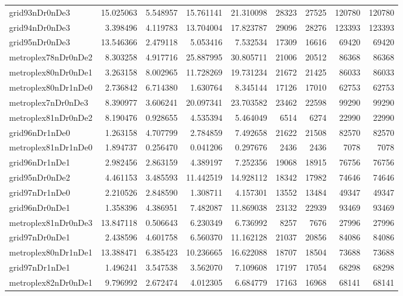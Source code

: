 \begin{longtable}{|l|r|r|r|r|r|r|r|r|}
grid93nDr0nDe3 & 15.025063 & 5.548957 & 15.761141 & 21.310098 & 28323 & 27525 & 120780 & 120780 \\
grid94nDr0nDe3 & 3.398496 & 4.119783 & 13.704004 & 17.823787 & 29096 & 28276 & 123393 & 123393 \\
grid95nDr0nDe3 & 13.546366 & 2.479118 & 5.053416 & 7.532534 & 17309 & 16616 & 69420 & 69420 \\
metroplex78nDr0nDe2 & 8.303258 & 4.917716 & 25.887995 & 30.805711 & 21006 & 20512 & 86368 & 86368 \\
metroplex80nDr0nDe1 & 3.263158 & 8.002965 & 11.728269 & 19.731234 & 21672 & 21425 & 86033 & 86033 \\
metroplex80nDr1nDe0 & 2.736842 & 6.714380 & 1.630764 & 8.345144 & 17126 & 17010 & 62753 & 62753 \\
metroplex7nDr0nDe3 & 8.390977 & 3.606241 & 20.097341 & 23.703582 & 23462 & 22598 & 99290 & 99290 \\
metroplex81nDr0nDe2 & 8.190476 & 0.928655 & 4.535394 & 5.464049 & 6514 & 6274 & 22990 & 22990 \\
grid96nDr1nDe0 & 1.263158 & 4.707799 & 2.784859 & 7.492658 & 21622 & 21508 & 82570 & 82570 \\
metroplex81nDr1nDe0 & 1.894737 & 0.256470 & 0.041206 & 0.297676 & 2436 & 2436 & 7078 & 7078 \\
grid96nDr1nDe1 & 2.982456 & 2.863159 & 4.389197 & 7.252356 & 19068 & 18915 & 76756 & 76756 \\
grid95nDr0nDe2 & 4.461153 & 3.485593 & 11.442519 & 14.928112 & 18342 & 17982 & 74646 & 74646 \\
grid97nDr1nDe0 & 2.210526 & 2.848590 & 1.308711 & 4.157301 & 13552 & 13484 & 49347 & 49347 \\
grid96nDr0nDe1 & 1.358396 & 4.386951 & 7.482087 & 11.869038 & 23132 & 22939 & 93469 & 93469 \\
metroplex81nDr0nDe3 & 13.847118 & 0.506643 & 6.230349 & 6.736992 & 8257 & 7676 & 27996 & 27996 \\
grid97nDr0nDe1 & 2.438596 & 4.601758 & 6.560370 & 11.162128 & 21037 & 20856 & 84086 & 84086 \\
metroplex80nDr1nDe1 & 13.388471 & 6.385423 & 10.236665 & 16.622088 & 18707 & 18504 & 73688 & 73688 \\
grid97nDr1nDe1 & 1.496241 & 3.547538 & 3.562070 & 7.109608 & 17197 & 17054 & 68298 & 68298 \\
metroplex82nDr0nDe1 & 9.796992 & 2.672474 & 4.012305 & 6.684779 & 17163 & 16968 & 68141 & 68141 \\

\end{longtable}

